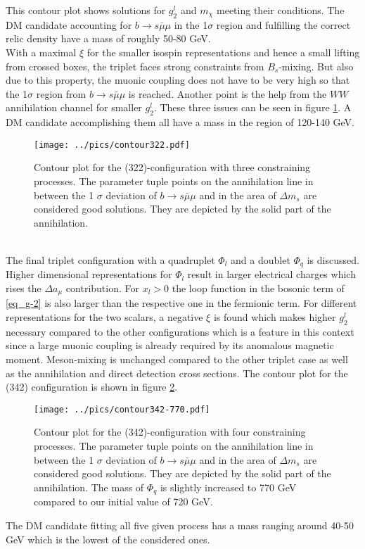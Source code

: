 This contour plot shows solutions for $g_2^l$ and $m_\chi$ meeting their conditions. The DM candidate accounting for  
$b\rightarrow s\bar\mu\mu$ in the 1$\sigma$ region and fulfilling the correct relic density have a mass of roughly 50-80 GeV.\\
\noindent With a maximal $\xi$ for the smaller isospin representations and hence a small lifting from crossed boxes, the triplet faces strong
constraints from $B_s$-mixing. But also due to this property, the muonic coupling does not have to be very high so that the 1$\sigma$ region from
$b\rightarrow s\bar\mu\mu$ is reached. Another point is the help from the $WW$ annihilation channel for smaller $g_2^l$. These three issues can be
seen in figure \ref{pic_TriRes}. A DM candidate accomplishing them all have a mass in the region of 120-140 GeV.
\begin{figure}[t]
 \texttt{[image: ../pics/contour322.pdf]}
 \caption{Contour plot for the (322)-configuration with three constraining processes. The parameter tuple points on the annihilation line in between the 
 1 $\sigma$ deviation of $b\rightarrow s\bar\mu\mu$ and in the area of $\Delta m_s$ are considered good solutions. They are depicted by the solid
 part of the annihilation.}
 \label{pic_TriRes}
\end{figure}
\\
\noindent The final triplet configuration with a quadruplet $\Phi_l$ and a doublet $\Phi_q$ is discussed. Higher dimensional representations for 
$\Phi_l$ result in larger electrical charges which rises the $\Delta a_\mu$ contribution. For $x_l>0$ the loop function in the bosonic term of
\eqref{eq_g-2} is also larger than the respective one in the fermionic term. For different representations for the two scalars, a negative $\xi$
is found which makes higher $g_2^l$ necessary compared to the other configurations which is a feature in this context since a large muonic coupling
is already required by its anomalous magnetic moment. Meson-mixing is unchanged compared to the other triplet case as well as the annihilation 
and direct detection cross sections. The contour plot for the (342) configuration is shown in figure \ref{pic_Tri342Res}.
\begin{figure}[t]
 \texttt{[image: ../pics/contour342-770.pdf]}
 \caption{Contour plot for the (342)-configuration with four constraining processes. The parameter tuple points on the annihilation line in between 
 the 1 $\sigma$ deviation of $b\rightarrow s\bar\mu\mu$ and in the area of $\Delta m_s$ are considered good solutions. They are depicted by the solid
 part of the annihilation. The mass of $\Phi_q$ is slightly increased to 770 GeV compared to our initial value of 720 GeV.}
 \label{pic_Tri342Res}
\end{figure}
The DM candidate fitting all five given process has a mass ranging around 40-50 GeV which is the lowest of the considered ones. 




